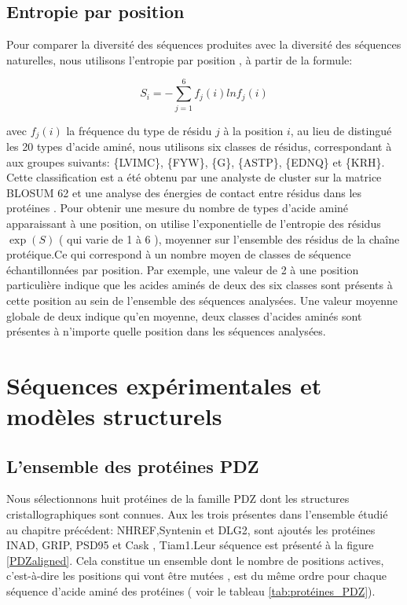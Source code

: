 \subsection{Entropie par position}
\label{subsection:Entropie}
Pour comparer la diversité des séquences produites avec la diversité des séquences naturelles, nous utilisons l'entropie par position \cite{DurbinBK}, à partir de la formule:

\begin{equation} \label{eq:entropy}
  S_i = - \sum_{j=1}^6 f_j(i)lnf_j(i)
\end{equation} 


avec $f_j(i)$ la fréquence du type de résidu $j$ à la position $i$, au lieu de distingué les 20 types d'acide aminé, nous utilisons six classes de résidus, correspondant à  aux groupes suivants: \{LVIMC\}, \{FYW\}, \{G\}, \{ASTP\}, \{EDNQ\} et \{KRH\}. Cette classification est a été obtenu par une analyste de cluster  sur la matrice BLOSUM 62 \label{eq:entropy} et une analyse  des énergies de contact entre résidus dans les protéines \cite{Launay07} . Pour obtenir une mesure du nombre de types d'acide aminé apparaissant à une position, on utilise l'exponentielle de l'entropie des résidus $\exp(S)$ ( qui varie de 1 à 6 ), moyenner sur l'ensemble des résidus de la chaîne protéique.Ce qui correspond à un nombre moyen de classes de séquence échantillonnées par position. Par exemple, une valeur de 2 à une position particulière indique que les acides aminés de deux des six classes sont présents à cette position au sein de l'ensemble des séquences analysées. Une valeur moyenne globale de deux indique qu'en moyenne, deux classes d'acides aminés sont présentes à n'importe quelle position dans les séquences analysées.


\section{Séquences expérimentales et modèles structurels}
\subsection{L'ensemble des protéines PDZ}

Nous sélectionnons huit protéines de la famille PDZ dont les structures cristallographiques sont connues. Aux les trois présentes dans l'ensemble étudié au chapitre précédent:  NHREF,Syntenin et DLG2, sont ajoutés les protéines INAD, GRIP, PSD95 et Cask , Tiam1.Leur séquence est présenté à la figure \ref{PDZaligned}. Cela constitue un ensemble dont le nombre de positions actives, c'est-à-dire les positions qui vont être mutées , est du même ordre pour chaque séquence d'acide aminé des protéines ( voir le tableau \ref{tab:protéines_PDZ}).


